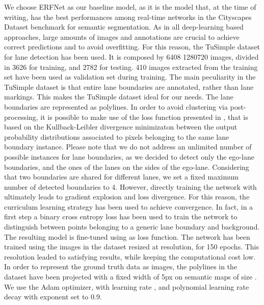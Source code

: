 \documentclass[runningheads]{llncs}
\begin{document}
We choose ERFNet \cite{romera2018erfnet} as our baseline model, as it is the model that, at the time of writing, has the best performances among real-time networks in the Cityscapes Dataset benchmark for semantic segmentation. As in all deep-learning based approaches, large amounts of images and annotations are crucial to achieve correct predictions and to avoid overfitting. For this reason, the TuSimple dataset for lane detection has been used. It is composed by 6408 1280720 images, divided in 3626 for training, and 2782 for testing. 410 images extracted from the training set have been used as validation set during training. The main peculiarity in the TuSimple dataset is that entire lane boundaries are annotated, rather than lane markings. This makes the TuSimple dataset ideal for our needs. The lane boundaries are represented as polylines. 
In order to avoid clustering via post-processing, it is possible to make use of the loss function presented in \cite{hsu2018}, that is based on the Kullback-Leibler divergence minimizaton between the output probability distributions associated to pixels belonging to the same lane boundary instance. Please note that we do not address an unlimited number of possible instances for lane boundaries, as we decided to detect only the ego-lane boundaries, and the ones of the lanes on the sides of the ego-lane. Considering that two boundaries are shared for different lanes, we set a fixed maximum number of detected boundaries to 4. However, directly training the network with \cite{hsu2018} ultimately leads to gradient explosion and loss divergence. For this reason, the curriculum learning strategy \cite{bengio2009curriculum} has been used to achieve convergence. In fact, in a first step a binary cross entropy loss has been used to train the network to distinguish between points belonging to a generic lane boundary and background. The resulting model is fine-tuned using \cite{hsu2018} as loss function. 
The network has been trained using the images in the dataset resized at  resolution, for 150 epochs. This resolution leaded to satisfying results, while keeping the computational cost low. In order to represent the ground truth data as images, the polylines in the dataset have been projected with a fixed width of 5px on semantic maps of size . We use the Adam optimizer, with learning rate , and polynomial learning rate decay with exponent set to 0.9.
\end{document}
